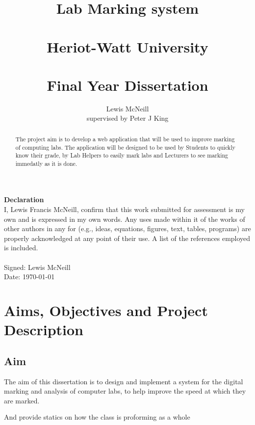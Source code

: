 \documentclass[12pt]{article}  %
\title{Lab Marking system \\~\\  \large{Heriot-Watt University} \\~\\ Final Year Dissertation}
\author{Lewis McNeill\\
supervised by
Peter J King}
\theoremstyle{definition}
\theoremstyle{remark}
\begin{document}
\maketitle
{}
\newpage 

\doublespacing
\textbf{\Large{Declaration}} \\[2em]
I, Lewis Francis McNeill, confirm that this work submitted for assessment is my own and is expressed in my own words. Any uses made within it of the works of other authors in any for (e.g., ideas, equations, figures, text, tables, programs) are properly acknowledged at any point of their use. A list of the references employed is included.
\\
\\
Signed: Lewis McNeill
\\
Date: \today

\newpage                    
\begin{abstract}

The project aim is to develop a web application that will be used to improve marking of computing labs. The application will be designed to be used by Students to quickly know their grade, by Lab Helpers to easily mark labs and Lecturers to see marking immedatly as it is done.



\end{abstract}

\newpage                     

\singlespacing
\tableofcontents
\doublespacing



\newpage        

\section{Aims, Objectives and Project Description}
\setcounter{page}{1}

\subsection{Aim}
The aim of this dissertation is to design and implement a system for the digital marking and analysis of computer labs, to help improve the speed at which they are marked.

And provide statics on how the class is proforming as a whole
\end{document}

